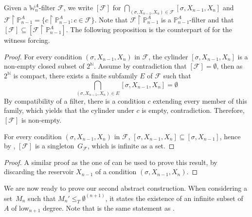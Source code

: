 \documentclass{article}
\def\NN{\mathbb{N}}
\def\PP{\mathbb{P}}
\def\WW{\mathbb{W}}
\def\F{\mathcal{F}}
\def\PP{\mathbb{P}}
\newcommand{\uh}{\upharpoonright}
\numberwithin{theorem}{section}
\newtheorem{proposition}[theorem]{Proposition}
\theoremstyle{definition}
\begin{document}
Given a $\WW^A_n$-filter $\F$, we write $[\F]$ for $\bigcap_{(\sigma,X_{n-1},X_{n}) \in \F} [\sigma,X_{n-1},X_{n}]$
and $\F \uh \PP^A_{n-1} = \{ c \uh \PP^A_{n-1} : c \in \F \}$. Note that $\F \uh \PP^A_{n-1}$ is a $\PP^A_{n-1}$-filter and that $[\F] \subseteq [\F \uh \PP^A_{n-1}]$.
The following proposition is the counterpart of  for the witness forcing. 

\begin{proof}
For every condition $(\sigma,X_{n-1}, X_n)$ in $\F$, the cylinder $[\sigma, X_{n-1}, X_n]$ is a non-empty closed subset of $2^{\NN}$. Assume by contradiction that $[\F] = \emptyset$, then as $2^{\NN}$ is compact, there exists a finite subfamily $E$ of $\F$ such that 
$$\bigcap_{(\sigma, X_{n-1}, X_n) \in E} [\sigma, X_{n-1}, X_n] = \emptyset$$ 
By compatibility of a filter, there is a condition $c$ extending every member of this family, which yields that the cylinder under $c$ is empty, contradiction. Therefore, $[\F]$ is non-empty. 

For every condition $(\sigma,X_{n-1}, X_n)$ in $\F$, $[\sigma, X_{n-1}, X_n] \subseteq [\sigma, X_{n-1}]$,
hence by , $[\F]$ is a singleton~$G_\F$, which is infinite as a set.
\end{proof}




\begin{proof}
A similar proof as the one of  can be used to prove this result, by discarding the reservoir $X_{n-1}$ of a condition $(\sigma, X_{n-1}, X_n)$.   
\end{proof}

We are now ready to prove our second abstract construction. When considering a set~$M_n$ such that $M_n' \leq_T \emptyset^{(n+1)}$, it states the existence of an infinite subset of~$A$ of low${}_{n+1}$ degree. Note that  is the same statement as .
\end{document}
